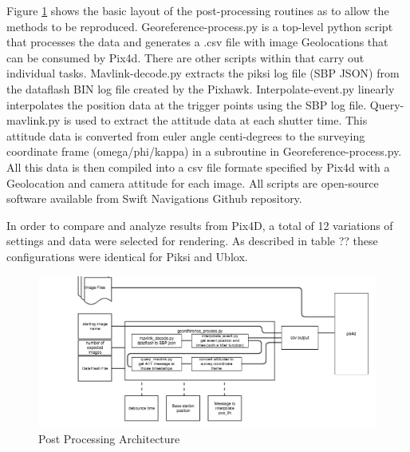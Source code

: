 \documentclass{article}
\begin{document}
Figure \ref{postprocess} shows the basic layout of the post-processing routines as to allow the methods to be reproduced.  Georeference-process.py is a top-level python script that processes the data and generates a .csv file with image Geolocations that can be consumed by Pix4d. There are other scripts within that carry out individual tasks. Mavlink-decode.py extracts the piksi log file (SBP JSON) from the dataflash BIN log file created by the Pixhawk. Interpolate-event.py linearly interpolates the position data at the trigger points using the SBP log file. Query-mavlink.py is used to extract the attitude data at each shutter time. This attitude data is converted from euler angle centi-degrees to the surveying coordinate frame (omega/phi/kappa) in a subroutine in Georeference-process.py. All this data is then compiled into a csv file formate specified by Pix4d with a Geolocation and camera attitude for each image.  All scripts are open-source software available from Swift Navigations Github repository.

In order to compare and analyze results from Pix4D, a total of 12 variations of settings and data were selected for rendering. As described in table ?? these configurations were identical for Piksi and Ublox. 


\begin{figure}
\begin{center}
\includegraphics[width=7in]{images/flow_charts/uav_survey_processing_architecture.png}
\caption{Post Processing Architecture}
\label{postprocess}
\end{center}
\end{figure}
\end{document}
